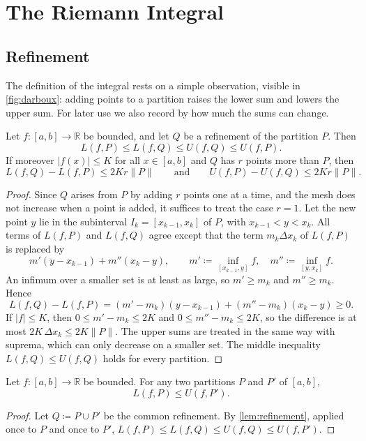 \section{The Riemann Integral}
\label{sec:riemann}

\subsection{Refinement}

The definition of the integral rests on a simple observation, visible in \cref{fig:darboux}: adding points to a partition raises the lower sum and lowers the upper sum. For later use we also record by how much the sums can change.

\begin{lemma}[Refinement]
\label{lem:refinement}
Let $f\colon[a,b]\to\mathbb R$ be bounded, and let $Q$ be a refinement of the partition $P$. Then
\[
L(f,P)\le L(f,Q)\le U(f,Q)\le U(f,P).
\]
If moreover $|f(x)|\le K$ for all $x\in[a,b]$ and $Q$ has $r$ points more than $P$, then
\[
L(f,Q)-L(f,P)\le2Kr\|P\|\qquad\text{and}\qquad U(f,P)-U(f,Q)\le2Kr\|P\| .
\]
\end{lemma}

\begin{proof}
Since $Q$ arises from $P$ by adding $r$ points one at a time, and the mesh does not increase when a point is added, it suffices to treat the case $r=1$. Let the new point $y$ lie in the subinterval $I_k=[x_{k-1},x_k]$ of $P$, with $x_{k-1}<y<x_k$. All terms of $L(f,P)$ and $L(f,Q)$ agree except that the term $m_k\Delta x_k$ of $L(f,P)$ is replaced by
\[
m'(y-x_{k-1})+m''(x_k-y),\qquad m'\coloneqq\inf_{[x_{k-1},y]}f,\quad m''\coloneqq\inf_{[y,x_k]}f .
\]
An infimum over a smaller set is at least as large, so $m'\ge m_k$ and $m''\ge m_k$. Hence
\[
L(f,Q)-L(f,P)=(m'-m_k)(y-x_{k-1})+(m''-m_k)(x_k-y)\ge0 .
\]
If $|f|\le K$, then $0\le m'-m_k\le2K$ and $0\le m''-m_k\le2K$, so the difference is at most $2K\,\Delta x_k\le2K\|P\|$. The upper sums are treated in the same way with suprema, which can only decrease on a smaller set. The middle inequality $L(f,Q)\le U(f,Q)$ holds for every partition.
\end{proof}

\begin{corollary}
\label{cor:lower-upper}
Let $f\colon[a,b]\to\mathbb R$ be bounded. For any two partitions $P$ and $P'$ of $[a,b]$,
\[
L(f,P)\le U(f,P').
\]
\end{corollary}

\begin{proof}
Let $Q\coloneqq P\cup P'$ be the common refinement. By \cref{lem:refinement}, applied once to $P$ and once to $P'$, $L(f,P)\le L(f,Q)\le U(f,Q)\le U(f,P')$.
\end{proof}

